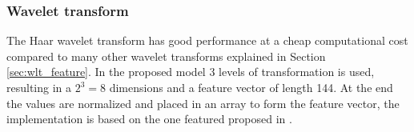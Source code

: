 \subsubsection{Wavelet transform}
\label{sec:meth:featextr:wt}
The Haar wavelet transform has good performance at a cheap computational cost compared to many other wavelet transforms explained in Section \ref{sec:wlt_feature}. In the proposed model 3 levels of transformation is used, resulting in a $2^3 = 8$ dimensions and a feature vector of length 144. At the end the values are normalized and placed in an array to form the feature vector, the implementation is based on the one featured proposed in \cite{wang2015new}.
